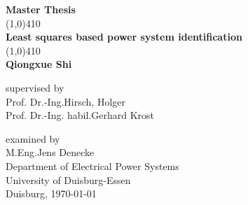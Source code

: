 \documentclass[12pt,a4paper]{article}
\author{Shi Qiongxue}
\begin{document}


   \begin{titlepage}
   \begin{center}
   \vspace*{5cm}
  \Large \textbf{Master Thesis}\\
   \vspace*{1.5cm}
   \line(1,0){410}\\
   [0.15in]
   \Large \textbf{Least squares based power system identification} \\
      \line(1,0){410}\\
   \vspace*{1cm}
   \textbf{Qiongxue Shi}\\
    \vspace*{3cm}
   \vspace*{5pt}
   \begin{normalsize}
    supervised by\\


     Prof. Dr.-Ing.Hirsch, Holger	\\
     Prof. Dr.-Ing. habil.Gerhard Krost\\
        \vspace*{0.5cm}
        
    examined by\\
          M.Eng.Jens Denecke\\


    \vspace*{2.5cm}
    Department of Electrical Power Systems\\
    University of Duisburg-Essen\\
        \vspace*{1cm}
    Duisburg, \today
    
    \end{normalsize} 

   \end{center}

   \end{titlepage}
\newpage
\end{document}
